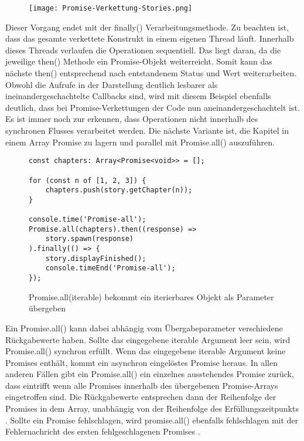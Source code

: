 \begin{figure}[H]
\centering
\texttt{[image: Promise-Verkettung-Stories.png]}
\end{figure}

\noindent
Dieser Vorgang endet mit der finally() Verarbeitungsmethode. Zu beachten ist, dass das gesamte verkettete Konstrukt in einem eigenen Thread läuft. Innerhalb dieses Threads verlaufen die Operationen sequentiell. Das liegt daran, da die jeweilige then() Methode ein Promise-Objekt weiterreicht. Somit kann das nächste then() entsprechend nach entstandenem Status und Wert weiterarbeiten. Obwohl die Aufrufe in der Darstellung deutlich lesbarer als ineinandergeschachtelte Callbacks sind, wird mit diesem Beispiel ebenfalls deutlich, dass bei Promise-Verkettungen der Code nun aneinandergeschachtelt ist. Es ist immer noch zur erkennen, dass Operationen nicht innerhalb des synchronen Flusses verarbeitet werden. Die nächste Variante ist, die Kapitel in einem Array Promise zu lagern und parallel mit Promise.all() auszuführen.

\begin{figure}[H]
\begin{lstlisting}[basicstyle=\small]
const chapters: Array<Promise<void>> = [];

for (const n of [1, 2, 3]) {
    chapters.push(story.getChapter(n));
}

console.time('Promise-all');
Promise.all(chapters).then((response) =>
    story.spawn(response)
).finally(() => {
    story.displayFinished();
    console.timeEnd('Promise-all');
});
\end{lstlisting}
\caption{Promise.all(iterable) bekommt ein iterierbares Objekt als Parameter übergeben}
\label{Promise-all-example}
\end{figure}

\noindent
Ein Promise.all() kann dabei abhängig vom Übergabeparameter verschiedene Rückgabewerte haben. Sollte das eingegebene iterable Argument leer sein, wird Promise.all() synchron erfüllt. Wenn das eingegebene iterable Argument keine Promises enthält, kommt ein asynchron eingelöstes Promise heraus. In allen anderen Fällen gibt ein Promise.all() ein einzelnes ausstehendes Promise zurück, dass eintrifft wenn alle Promises innerhalb des übergebenen Promise-Arrays eingetroffen sind. Die Rückgabewerte entsprechen dann der Reihenfolge der Promises in dem Array, unabhängig von der Reihenfolge des Erfüllungszeitpunkts \cite{promise-all}. Sollte ein Promise fehlschlagen, wird promise.all() ebenfalls fehlschlagen mit der Fehlernachricht des ersten fehlgeschlagenen Promises \cite{promise-executor}.\\

